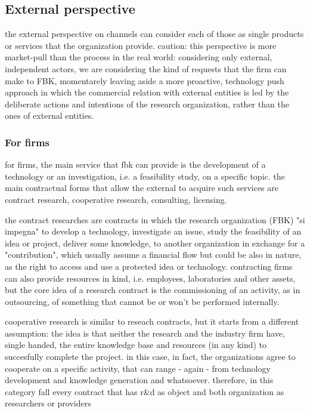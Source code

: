 \subsection{External perspective}

the external perspective on channels can consider each of those as single products or services that the organization provide. caution: this perspective is more market-pull than the process in the real world: considering only external, independent actors, we are considering the kind of requests that the firm can make to FBK, momentarely leaving aside a more proactive, technology push approach in which the commercial relation with external entities is led by the deliberate actions and intentions of the research organization, rather than the ones of external entities.

\subsubsection{For firms}

for firms, the main service that fbk can provide is the development of a technology or an investigation, i.e. a feasibility study, on a specific topic. the main contractual forms that allow the external to acquire such services are contract research, cooperative research, consulting, licensing. 

the contract researches are contracts in which the research organization (FBK) "si impegna" to develop a technology, investigate an issue, study the feasibility of an idea or project, deliver some knowledge, to another organization in exchange for a "contribution", which usually assume a financial flow but could be also in nature, as the right to access and use a protected idea or technology. contracting firms can also provide resources in kind, i.e. employees, laboratories and other assets, but the core idea of a research contract is the commissioning of an activity, as in outsourcing, of something that cannot be or won't be performed internally.

cooperative research is similar to reseach contracts, but it starts from a different assumption: the idea is that neither the research and the industry firm have, single handed, the entire knowledge base and resources (in any kind) to succesfully complete the project. in this case, in fact, the organizations agree to cooperate on a specific activity, that can range - again - from technology development and knowledge generation and whatsoever. therefore, in this category fall every contract that has r\&d as object and both organization as researchers or providers

